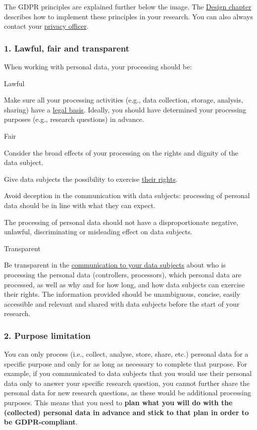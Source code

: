 \documentclass[
]{book}
\begin{document}
The GDPR principles are explained further below the image. The
\protect\hyperlink{privacy-by-design}{Design chapter} describes how to implement these principles
in your research. You can also always contact your \protect\hyperlink{support}{privacy officer}.

\hypertarget{lawful-fair-and-transparent}{%
\subsubsection{1. Lawful, fair and transparent}\label{lawful-fair-and-transparent}}

When working with personal data, your processing should be:

Lawful

Make sure all your processing activities (e.g., data collection, storage,
analysis, sharing) have a \protect\hyperlink{legal-basis}{legal basis}. Ideally,
you should have determined your processing purposes (e.g., research questions)
in advance.

Fair

Consider the broad effects of your processing on the rights and dignity of the data subject.

Give data subjects the possibility to exercise \protect\hyperlink{data-subject-rights}{their rights}.

Avoid deception in the communication with data subjects: processing of personal data should be in line with what they can expect.

The processing of personal data should not have a disproportionate negative, unlawful, discriminating or misleading effect on data subjects.

Transparent

Be transparent in the \protect\hyperlink{privacy-notices}{communication to your data subjects}
about who is processing the personal data (controllers, processors), which
personal data are processed, as well as why and for how long, and how data
subjects can exercise their rights. The information provided should be
unambiguous, concise, easily accessible and relevant and shared with data
subjects before the start of your research.

\hypertarget{purpose-limitation}{%
\subsubsection{2. Purpose limitation}\label{purpose-limitation}}

You can only process (i.e., collect, analyse, store, share, etc.) personal data
for a specific purpose and only for as long as necessary to complete that purpose.
For example, if you communicated to data subjects that you would use their
personal data only to answer your specific research question, you cannot further
share the personal data for new research questions, as these would be additional
processing purposes. This means that you need to \textbf{plan what you will do with
the (collected) personal data in advance and stick to that plan in order to be
GDPR-compliant}.
\end{document}
